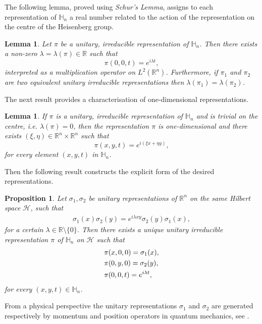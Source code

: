 \documentclass[12pt,oneside,a4paper]{book}
\numberwithin{equation}{section}     %
\theoremstyle{plain}
\newtheorem{proposition}[theorem]{Proposition}
\newtheorem{lemma}[theorem]{Lemma}
\theoremstyle{definition}
\newcommand{\R}{{\mathbb R}}
\newcommand{\Rn}{{\R}^n}
\begin{document}
The following lemma, proved using \textit{Schur's Lemma}, assigns to each representation of $\mathbb{H}_n$ a real number related to the action of the representation on the centre of the Heisenberg group.
\begin{lemma}\label{lemmaCentre}
	Let $\pi$ be a unitary, irreducible representation of $\mathbb{H}_n$. Then there exists a non-zero $\lambda=\lambda(\pi)\in\R$ such that
	\[
	\pi(0,0,t)=e^{i\lambda t},
	\]
	interpreted as a multiplication operator on $L^2(\Rn)$.
	Furthermore, if $\pi_1$ and $\pi_2$ are two equivalent unitary irreducible representations then $\lambda(\pi_1)=\lambda(\pi_2)$.
\end{lemma}
The next result provides a characterisation of one-dimensional representations.
\begin{lemma}\label{trivialoncentre}
	If $\pi$ is a unitary, irreducible representation of $\mathbb{H}_n$ and is trivial on the centre, i.e. $\lambda(\pi)=0$, then the representation $\pi$ is one-dimensional and there exists $(\xi,\eta)\in\Rn\times\Rn$ such that
	\[
	\pi(x,y,t)=e^{i(\xi x+\eta y)},
	\]
	for every element $(x,y,t)$ in $\mathbb{H}_n$.
\end{lemma}
Then the following result constructs the explicit form of the desired representations.
\begin{proposition}\label{Prop1}
	Let $\sigma_1,\sigma_2$ be unitary representations of $\Rn$ on the same Hilbert space $\mathcal{H}$, such that
	\begin{align}\label{comrel}
	\sigma_1(x)\sigma_2(y)=e^{i\lambda x y}\sigma_2(y)\sigma_1(x),
	\end{align}
	for a certain $\lambda\in\R\setminus\{0\}$. Then there exists a unique unitary irreducible representation $\pi$ of $\mathbb{H}_n$ on $\mathcal{H}$ such that
	\begin{align}\notag
	&\pi(x,0,0)=\sigma_1(x),\\\notag
	&\pi(0,y,0)=\sigma_2(y),\\\notag
	&\pi(0,0,t)=e^{i \lambda t},
	\end{align}
	for every $(x,y,t)\in\mathbb{H}_n$.
\end{proposition}
From a physical perspective the unitary representations $\sigma_1$ and $\sigma_2$ are generated respectively by momentum and position operators in quantum mechanics, see \cite{T2008}. 
\end{document}
